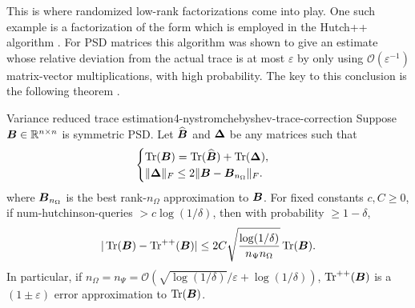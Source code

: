This is where randomized low-rank factorizations come into play.
One such example is a factorization of the form 
which is employed in the Hutch++ algorithm \cite[algorithm~1]{meyer2021hutch}.
For \gls{PSD} matrices this algorithm was shown to give
an estimate whose relative deviation from the actual trace is at most
$\varepsilon$ by only using $\mathcal{O}(\varepsilon^{-1})$ matrix-vector multiplications,
with high probability. The key to this conclusion is the following theorem \cite[theorem~1]{meyer2021hutch}.
\begin{theorem}{Variance reduced trace estimation}{4-nystromchebyshev-trace-correction}
    Suppose $\boldsymbol{B} \in \mathbb{R}^{n \times n}$ is symmetric \gls{PSD}. Let $\widehat{\boldsymbol{B}}$ and
    $\boldsymbol{\Delta}$ be any matrices such that
    \begin{equation}
        \begin{cases}
            \operatorname{Tr}(\boldsymbol{B}) = \operatorname{Tr}(\widehat{\boldsymbol{B}}) + \operatorname{Tr}(\boldsymbol{\Delta}), \\
            \lVert \boldsymbol{\Delta} \rVert _F \leq 2 \lVert \boldsymbol{B} - \boldsymbol{B}_{n_{\Omega}} \rVert _F.
        \end{cases}
    \end{equation}
    where $\boldsymbol{B}_{n_{\Omega}}$ is the best rank-$n_{\Omega}$ approximation to $\boldsymbol{B}$.
    For fixed constants $c, C \geq 0$, if \gls{num-hutchinson-queries} $> c\log(1/\delta)$, then with probability $\geq 1 - \delta$,
    \begin{equation}
        |\operatorname{Tr}(\boldsymbol{B}) - \operatorname{Tr}^{++}(\boldsymbol{B})| \leq 2 C \sqrt{\frac{\log(1/\delta)}{n_{\Psi} n_{\Omega}}} \operatorname{Tr}(\boldsymbol{B}).
    \end{equation}
    In particular, if $n_{\Omega}=n_{\Psi}=\mathcal{O}\left( \sqrt{\log(1/\delta)}/ \varepsilon + \log(1/\delta) \right)$, $\operatorname{Tr}^{++}(\boldsymbol{B})$ is a $(1 \pm \varepsilon)$ error approximation to $\operatorname{Tr}(\boldsymbol{B})$.
\end{theorem}

